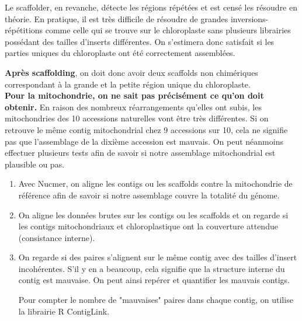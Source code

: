 \documentclass[a4paper]{article}
\begin{document}
Le scaffolder, en revanche, détecte les régions répétées et est censé les résoudre en théorie. En pratique, il est très difficile de résoudre de grandes inversions-répétitions comme celle qui se trouve sur le chloroplaste sans plusieurs librairies possédant des tailles d'inserts différentes. On s'estimera donc satisfait si les parties uniques du chloroplaste ont été correctement assemblées.

\textbf{Après scaffolding}, on doit donc avoir deux scaffolds non chimériques correspondant à la grande et la petite région unique du chloroplaste. \\

\textbf{Pour la mitochondrie, on ne sait pas précisément ce qu'on doit obtenir.} En raison des nombreux réarrangements qu'elles ont subis, les mitochondries des 10 accessions naturelles vont être très différentes. \cite{arrieta2009diversity} Si on retrouve le même contig mitochondrial chez 9 accessions sur 10, cela ne signifie pas que l'assemblage de la dixième accession est mauvais. On peut néanmoins effectuer plusieurs tests afin de savoir si notre assemblage mitochondrial est plausible ou pas. 


\begin{enumerate}
\item Avec Nucmer, on aligne les contigs ou les scaffolds contre la mitochondrie de référence afin de savoir si notre assemblage couvre la totalité du génome.

\item On aligne les données brutes sur les contigs ou les scaffolds et on regarde si les contigs mitochondriaux et chloroplastique ont la couverture attendue (consistance interne).

\item On regarde si des paires s'alignent sur le même contig avec des tailles d'insert incohérentes. S'il y en a beaucoup, cela signifie que la structure interne du contig est mauvaise. On peut ainsi repérer et quantifier les mauvais contigs.

Pour compter le nombre de "mauvaises" paires dans chaque contig, on utilise la librairie R ContigLink. 

\end{enumerate}
\end{document}

